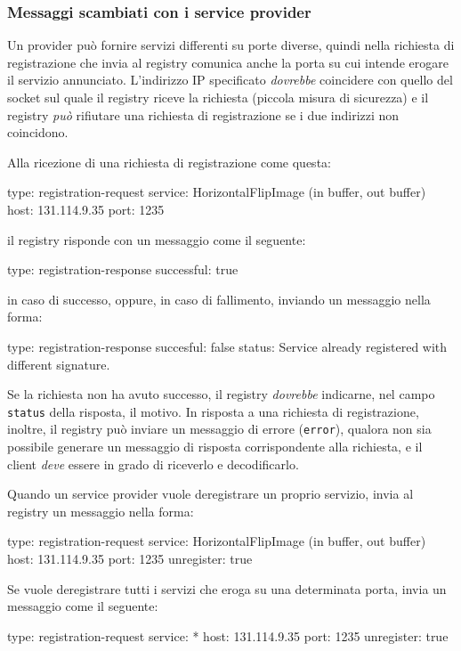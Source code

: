 \documentclass[a4paper,twoside]{article}
\newcommand\code{\lstinline[basicstyle=\normalsize\ttfamily]}
\begin{document}
\subsubsection{Messaggi scambiati con i service provider}

Un provider può fornire servizi differenti su porte diverse, quindi nella richiesta di registrazione che invia al registry comunica anche la porta su cui intende erogare il servizio annunciato. L'indirizzo IP specificato \emph{dovrebbe} coincidere con quello del socket sul quale il registry riceve la richiesta (piccola misura di sicurezza) e il registry \emph{può} rifiutare una richiesta di registrazione se i due indirizzi non coincidono.

Alla ricezione di una richiesta di registrazione come questa:
\begin{yaml}
type: registration-request
service: HorizontalFlipImage (in buffer, out buffer)
host: 131.114.9.35
port: 1235
\end{yaml}
il registry risponde con un messaggio come il seguente:
\begin{yaml}
type: registration-response
successful: true
\end{yaml}
in caso di successo, oppure, in caso di fallimento, inviando un messaggio nella forma:
\begin{yaml}
type: registration-response
succesful: false
status: Service already registered with different signature.
\end{yaml}
Se la richiesta non ha avuto successo, il registry \emph{dovrebbe} indicarne, nel campo \code|status| della risposta, il motivo. In risposta a una richiesta di registrazione, inoltre, il registry può inviare un messaggio di errore (\code|error|), qualora non sia possibile generare un messaggio di risposta corrispondente alla richiesta, e il client \emph{deve} essere in grado di riceverlo e decodificarlo.

Quando un service provider vuole deregistrare un proprio servizio, invia al registry un messaggio nella forma:
\begin{yaml}
type: registration-request
service: HorizontalFlipImage (in buffer, out buffer)
host: 131.114.9.35
port: 1235
unregister: true
\end{yaml}
Se vuole deregistrare tutti i servizi che eroga su una determinata porta, invia un messaggio come il seguente:
\begin{yaml}
type: registration-request
service: *
host: 131.114.9.35
port: 1235
unregister: true
\end{yaml}
\end{document}
